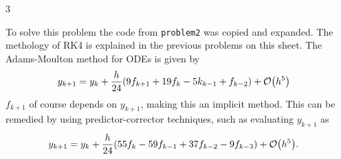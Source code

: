 \documentclass[12pt]{article}
\newenvironment{sol}[1][Solution]{\begin{trivlist}
\item[\hskip \labelsep {\bfseries #1:}]}{\end{trivlist}}
\DeclarePairedDelimiter\rb{(}{)}
\begin{document}
\begin{sol} 3 \end{sol}
To solve this problem the code from \texttt{problem2} was copied and expanded. The methology of RK4 is explained in the previous problems on this sheet. The Adams-Moulton method for ODEs is given by
\begin{align*}
    y_{k+1} & =  y_{k} + \frac{h}{24} \rb*{ 9 f_{k+1} + 19 f_{k} - 5 k_{k - 1} + f_{k-2}} + \mathcal{O} \rb*{h^{5}} &\\
\end{align*}
\(f_{k+1}\) of course depends on \(y_{k+1}\), making this an implicit method. This can be remedied by using predictor-corrector techniques, such as evaluating \(y_{k+1}\) as 
\begin{align*}
    y_{k+1} & =  y_{k} + \frac{h}{24} \rb*{ 55 f_{k}  - 59 f_{k - 1} + 37 f_{k - 2} - 9 f_{k - 3}} + \mathcal{O} \rb*{h^{5}}. &\\
\end{align*}
\end{document}
